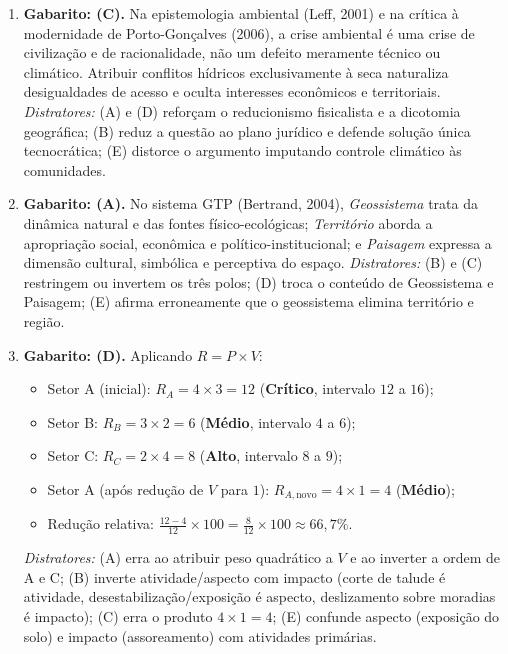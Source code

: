 \begin{boxGabarito}
\small
\begin{enumerate}[leftmargin=1.8em, itemsep=5pt]
  \item \textbf{Gabarito: (C).} Na epistemologia ambiental (Leff, 2001) e na crítica à modernidade de Porto-Gonçalves (2006), a crise ambiental é uma crise de civilização e de racionalidade, não um defeito meramente técnico ou climático. Atribuir conflitos hídricos exclusivamente à seca naturaliza desigualdades de acesso e oculta interesses econômicos e territoriais. \textit{Distratores:} (A) e (D) reforçam o reducionismo fisicalista e a dicotomia geográfica; (B) reduz a questão ao plano jurídico e defende solução única tecnocrática; (E) distorce o argumento imputando controle climático às comunidades.

  \item \textbf{Gabarito: (A).} No sistema GTP (Bertrand, 2004), \textit{Geossistema} trata da dinâmica natural e das fontes físico-ecológicas; \textit{Território} aborda a apropriação social, econômica e político-institucional; e \textit{Paisagem} expressa a dimensão cultural, simbólica e perceptiva do espaço. \textit{Distratores:} (B) e (C) restringem ou invertem os três polos; (D) troca o conteúdo de Geossistema e Paisagem; (E) afirma erroneamente que o geossistema elimina território e região.

  \item \textbf{Gabarito: (D).} Aplicando $R = P \times V$:
  \begin{itemize}[leftmargin=1.4em, itemsep=1pt, topsep=2pt]
    \item Setor A (inicial): $R_A = 4 \times 3 = 12$ (\textbf{Crítico}, intervalo $12$ a $16$);
    \item Setor B: $R_B = 3 \times 2 = 6$ (\textbf{Médio}, intervalo $4$ a $6$);
    \item Setor C: $R_C = 2 \times 4 = 8$ (\textbf{Alto}, intervalo $8$ a $9$);
    \item Setor A (após redução de $V$ para $1$): $R_{A,\text{novo}} = 4 \times 1 = 4$ (\textbf{Médio});
    \item Redução relativa: $\frac{12 - 4}{12} \times 100 = \frac{8}{12} \times 100 \approx 66,7\%$.
  \end{itemize}
  \textit{Distratores:} (A) erra ao atribuir peso quadrático a $V$ e ao inverter a ordem de A e C; (B) inverte atividade/aspecto com impacto (corte de talude é atividade, desestabilização/exposição é aspecto, deslizamento sobre moradias é impacto); (C) erra o produto $4 \times 1 = 4$; (E) confunde aspecto (exposição do solo) e impacto (assoreamento) com atividades primárias.


\end{enumerate}
\end{boxGabarito}
